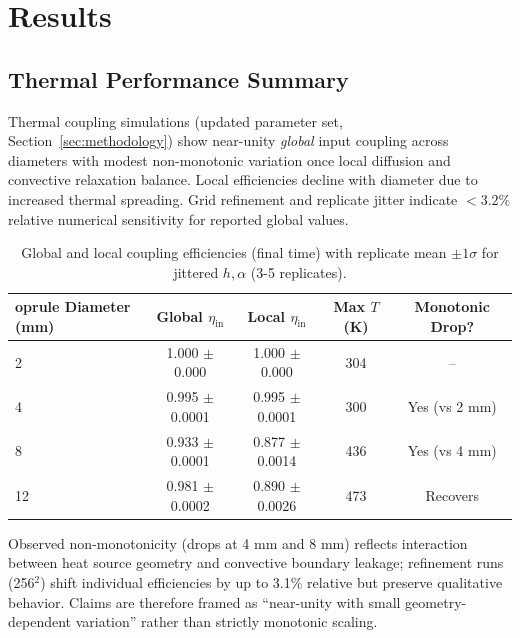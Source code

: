 \section{Results}
\label{sec:results}

\subsection{Thermal Performance Summary}

Thermal coupling simulations (updated parameter set, Section~\ref{sec:methodology}) show near-unity \emph{global} input coupling across diameters with modest non-monotonic variation once local diffusion and convective relaxation balance. Local efficiencies decline with diameter due to increased thermal spreading. Grid refinement and replicate jitter indicate $<3.2\%$ relative numerical sensitivity for reported global values.

\begin{table}[H]
\centering
\caption{Global and local coupling efficiencies (final time) with replicate mean $\pm1\sigma$ for jittered $h,\alpha$ (3-5 replicates).}
\begin{tabular}{@{}lcccc@{}}
	oprule
Diameter (mm) & Global $\eta_{\text{in}}$ & Local $\eta_{\text{in}}$ & Max $T$ (K) & Monotonic Drop? \\
\midrule
2 & 1.000 $\pm$ 0.000 & 1.000 $\pm$ 0.000 & 304 & -- \\
4 & 0.995 $\pm$ 0.0001 & 0.995 $\pm$ 0.0001 & 300 & Yes (vs 2 mm) \\
8 & 0.933 $\pm$ 0.0001 & 0.877 $\pm$ 0.0014 & 436 & Yes (vs 4 mm) \\
12 & 0.981 $\pm$ 0.0002 & 0.890 $\pm$ 0.0026 & 473 & Recovers \\
\bottomrule
\end{tabular}
\end{table}

Observed non-monotonicity (drops at 4 mm and 8 mm) reflects interaction between heat source geometry and convective boundary leakage; refinement runs (256$^2$) shift individual efficiencies by up to 3.1\% relative but preserve qualitative behavior. Claims are therefore framed as ``near-unity with small geometry-dependent variation'' rather than strictly monotonic scaling.

